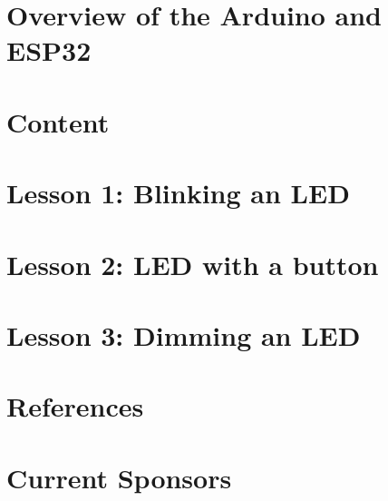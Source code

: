 \documentclass[a4paper,12pt]{report}
\begin{document}
\section*{Overview of the Arduino and ESP32}

\newpage
\section*{Content}

\newpage
\section*{Lesson 1: Blinking an LED}

\newpage
\section*{Lesson 2: LED with a button}

\newpage
\section*{Lesson 3: Dimming an LED}

\newpage
\section*{References}

\newpage
\section*{Current Sponsors}

\end{document}

